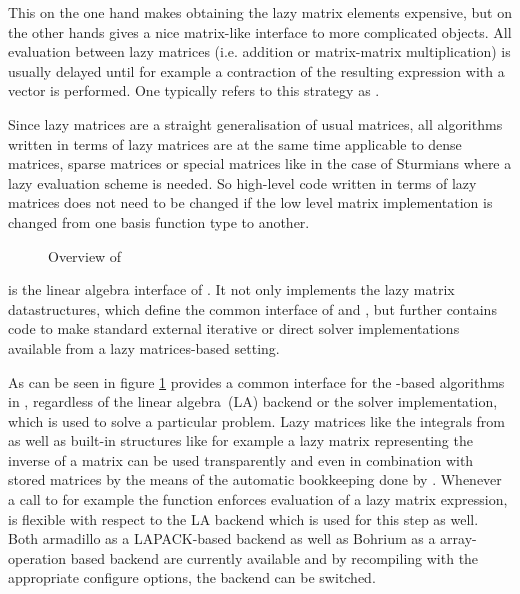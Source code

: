 This on the one hand makes obtaining the lazy matrix elements
expensive, but on the other hands gives a nice matrix-like
interface to more complicated objects.
All evaluation between lazy matrices
(i.e. addition or matrix-matrix multiplication)
is usually delayed until for example a contraction of the resulting
expression with a vector is performed.
One typically refers to this strategy as .

Since lazy matrices are a straight generalisation
of usual matrices,
all algorithms written in terms of lazy matrices
are at the same time applicable to dense matrices,
sparse matrices or special matrices like in the case of Sturmians
where a lazy evaluation scheme is needed.
So high-level code written in terms of lazy matrices
does not need to be changed if the low level matrix implementation
is changed from one basis function type to another.
%
%



\begin{figure}
	\caption{Overview of \lazyten}
	\label{fig:lazyten}
\end{figure}



\lazyten is the linear algebra interface of \molsturm.
It not only implements the lazy matrix datastructures,
which define the common interface of \gint and \gscf,
but further contains code to make standard external
iterative or direct solver implementations available
from a lazy matrices-based setting.

As can be seen in figure \ref{fig:lazyten} \lazyten provides
a common interface for the \contraction-based algorithms in \gscf,
regardless of the linear algebra~(LA) backend or the solver implementation,
which is used to solve a particular problem.
Lazy matrices like the integrals from \gint as well as built-in structures
like for example a lazy matrix representing the inverse of a matrix
can be used transparently and even in combination with stored matrices
by the means of the automatic bookkeeping done by \lazyten.
Whenever a call to for example the \contraction function enforces
evaluation of a lazy matrix expression,
\lazyten is flexible with respect to the LA backend which is used for
this step as well.
Both armadillo as a LAPACK-based backend as well as Bohrium as a array-operation based backend
are currently available and by recompiling \molsturm with the appropriate configure options,
the backend can be switched.

